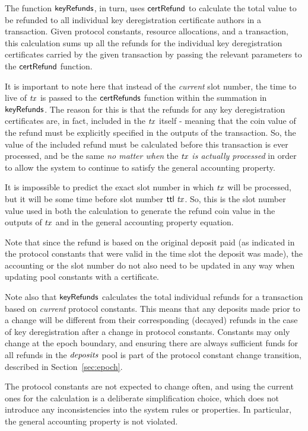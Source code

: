 \documentclass[11pt,a4paper,dvipsnames]{article}
\theoremstyle{definition}
\theoremstyle{definition}
\begin{document}
The function $\mathsf{keyRefunds}$, in turn, uses $\mathsf{certRefund}$ to calculate
the total value to be refunded to all individual key deregistration
certificate authors in a transaction.
Given protocol constants, resource allocations, and a transaction,
this calculation sums up all the refunds for the individual key
deregistration certificates
carried by the given transaction by passing the relevant parameters to the
$\mathsf{certRefund}$ function.

It is important to note here that instead of the \textit{current} slot number,
the time to live of $\mathit{tx}$ is passed to the $\mathsf{certRefunds}$ function
within the summation in $\mathsf{keyRefunds}$. The reason for this is that the
refunds for any key deregistration certificates are, in fact, included in
the $\mathit{tx}$ itself - meaning that the coin value of the refund must be
explicitly specified in the outputs of the transaction. So,
the value of the included refund must be calculated before this transaction
is ever processed, and be the same \textit{no matter when} the $\mathit{tx}$
\textit{is actually processed} in order to allow the system to continue to
satisfy the general accounting property.

It is impossible to predict the exact slot
number in which $\mathit{tx}$ will be processed, but it will be some time before
slot number $\mathsf{ttl}~\mathit{tx}$. So, this is the slot number value used in both
the calculation to generate the refund coin value in the outputs of $\mathit{tx}$
and in the general accounting property equation.

Note that since the refund is based
on the original deposit paid (as indicated in the protocol constants that
were valid in the time slot the deposit was made), the accounting or the slot
number do not also need to be updated in any way when updating pool constants with
a certificate.

Note also that
$\mathsf{keyRefunds}$ calculates the total individual refunds for a transaction
based on \textit{current} protocol constants. This means that any deposits
made prior to a change will be different from their corresponding
(decayed) refunds in the case of key deregistration after a change in
protocol constants. Constants may only change at the epoch boundary, and
ensuring there are always sufficient funds for all
refunds in the $\mathit{deposits}$ pool is part of the protocol constant
change transition, described in Section~\ref{sec:epoch}.

The protocol constants are not
expected to change often, and using the current ones for the calculation
is a deliberate simplification choice, which does not introduce any inconsistencies
into the system rules or properties. In particular, the general accounting
property is not violated.
\end{document}
